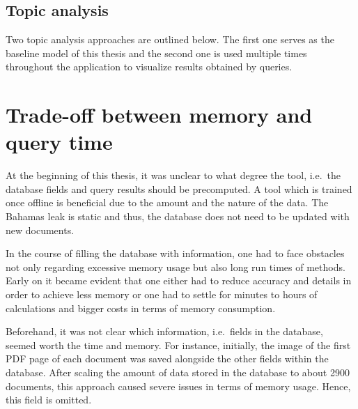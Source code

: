 







\subsection{Topic analysis}\label{impl-topic-modeling}

Two topic analysis approaches are outlined below.
The first one serves as the baseline model of this thesis and 
the second one is used multiple times throughout the application to visualize results obtained by queries.










\section{Trade-off between memory and query time}\label{sec:trade-off}

At the beginning of this thesis, it was unclear to what degree the tool, 
i.e.\ the database fields and query results should be precomputed.
A tool which is trained once offline is beneficial due to the amount and the nature of the data.
The Bahamas leak is static and thus, the database does not need to be updated with new documents.

In the course of filling the database with information, 
one had to face obstacles not only regarding excessive memory usage but also long run times of methods.
Early on it became evident that one either had to reduce accuracy and details in order to achieve less memory or 
one had to settle for minutes to hours of calculations and bigger costs in terms of memory consumption.

Beforehand, it was not clear which information, i.e.\ fields in the database, seemed worth the time and memory.
For instance, initially, the image of the first PDF page of each document was saved alongside the other fields within the database.
After scaling the amount of data stored in the database to about 2900 documents, 
this approach caused severe issues in terms of memory usage.
Hence, this field is omitted.